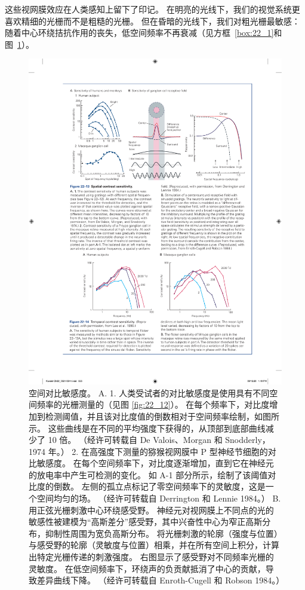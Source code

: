 这些视网膜效应在人类感知上留下了印记。
在明亮的光线下，我们的视觉系统更喜欢精细的光栅而不是粗糙的光栅。
但在昏暗的光线下，我们对粗光栅最敏感：随着中心环绕拮抗作用的丧失，低空间频率不再衰减（见方框~\ref{box:22_1}和图~\ref{fig:22_13}）。


\begin{figure}[htbp]
	\centering
	\includegraphics[width=1.0\linewidth]{chap22/fig_22_13}
	\caption{空间对比敏感度。 
		A. 1. 人类受试者的对比敏感度是使用具有不同空间频率的光栅测量的（见图 \ref{fig:22_12}）。 
		在每个频率下，对比度增加到检测阈值，并且该对比度值的倒数相对于空间频率绘制，如图所示。 
		这些曲线是在不同的平均强度下获得的，从顶部到底部曲线减少了 10 倍。 （经许可转载自 De Valois、Morgan 和 Snodderly，1974 年。） 
		2. 在高强度下测量的猕猴视网膜中 P 型神经节细胞的对比敏感度。 
		在每个空间频率下，对比度逐渐增加，直到它在神经元的放电率中产生可检测的变化。
		如 A-1 部分所示，绘制了该阈值对比度的倒数。 
		左侧的孤立点标记了零空间频率下的灵敏度，这是一个空间均匀的场。 （经许可转载自 Derrington 和 Lennie 1984。） 
		B. 用正弦光栅刺激中心环绕感受野。 神经元对视网膜上不同点的光的敏感性被建模为“高斯差分”感受野，其中兴奋性中心为窄正高斯分布，抑制性周围为宽负高斯分布。 将光栅刺激的轮廓（强度与位置）与感受野的轮廓（灵敏度与位置）相乘，并在所有空间上积分，计算出特定光栅传递的刺激强度。 
		右图显示了感受野对不同频率光栅的灵敏度。 在低空间频率下，环绕声的负贡献抵消了中心的贡献，导致差异曲线下降。 （经许可转载自 Enroth-Cugell 和 Robson 1984。）}
	\label{fig:22_13}
\end{figure}


